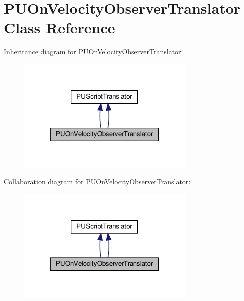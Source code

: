 \hypertarget{classPUOnVelocityObserverTranslator}{}\section{P\+U\+On\+Velocity\+Observer\+Translator Class Reference}
\label{classPUOnVelocityObserverTranslator}


Inheritance diagram for P\+U\+On\+Velocity\+Observer\+Translator\+:
\nopagebreak
\begin{figure}[H]
\begin{center}
\leavevmode
\includegraphics[width=242pt]{classPUOnVelocityObserverTranslator__inherit__graph}
\end{center}
\end{figure}


Collaboration diagram for P\+U\+On\+Velocity\+Observer\+Translator\+:
\nopagebreak
\begin{figure}[H]
\begin{center}
\leavevmode
\includegraphics[width=242pt]{classPUOnVelocityObserverTranslator__coll__graph}
\end{center}
\end{figure}
